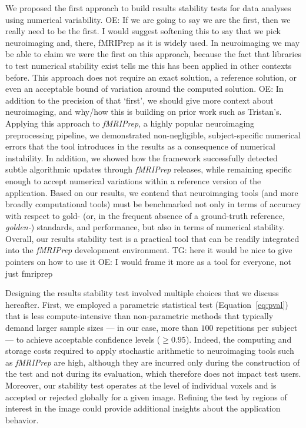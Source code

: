 \documentclass[lettersize,journal]{IEEEtran}
\newcommand{\TG}[1]{\color{orange}\textsc{TG:} #1\color{black}\xspace}
\newcommand{\oesteban}[1]{\color{orange}\textsc{OE:} #1\color{black}\xspace}
\newcommand{\fmriprep}{\emph{fMRIPrep}\xspace}
\begin{document}
We proposed the first approach to build results stability tests for data analyses using numerical variability.
\oesteban{If we are going to say we are the first, then we really need to be the first.
I would suggest softening this to say that we pick neuroimaging and, there, fMRIPrep as it is widely used.
In neuroimaging we may be able to claim we were the first on this approach, because the fact that libraries to
test numerical stability exist tells me this has been applied in other contexts before.}
This approach does not require an exact solution, a reference solution, or even an acceptable bound of variation around the computed solution.
\oesteban{In addition to the precision of that `first', we should give more context about neuroimaging, and why/how
this is building on prior work such as Tristan's.}
Applying this approach to \fmriprep, a highly popular neuroimaging preprocessing pipeline, we demonstrated
  non-negligible, subject-specific numerical errors that the tool introduces in the results as a consequence
  of numerical instability.
In addition, we showed how the framework successfully detected subtle algorithmic updates through \fmriprep releases,
  while remaining specific enough to accept numerical variations within a reference version of the application.
Based on our results, we contend that neuroimaging tools (and more broadly computational tools) must be
  benchmarked not only in terms of accuracy with respect to gold- (or, in the frequent absence of a ground-truth reference,
  \emph{golden-}) standards, and performance, but also in terms of numerical stability.
Overall, our results stability test is a practical tool that can be readily integrated into the \fmriprep development environment. \TG{here it would be nice to give pointers on how to use it}
\oesteban{I would frame it more as a tool for everyone, not just fmriprep}

Designing the results stability test involved multiple choices that we discuss hereafter.
First, we employed a parametric statistical test (Equation~\ref{eq:pval}) that is less compute-intensive than non-parametric methods that typically demand larger sample sizes --- in our case, more than $100$ repetitions per subject --- to achieve acceptable confidence levels ($\geq 0.95$).
Indeed, the computing and storage costs required to apply stochastic arithmetic to neuroimaging tools such as \fmriprep are high, although they are incurred only during the construction of the test
and not during its evaluation, which therefore does not impact test users. Moreover, our stability test operates at the level of individual voxels and is accepted or rejected globally for a given image. Refining the test by regions of interest in the image could provide additional insights about the application behavior.
\end{document}

